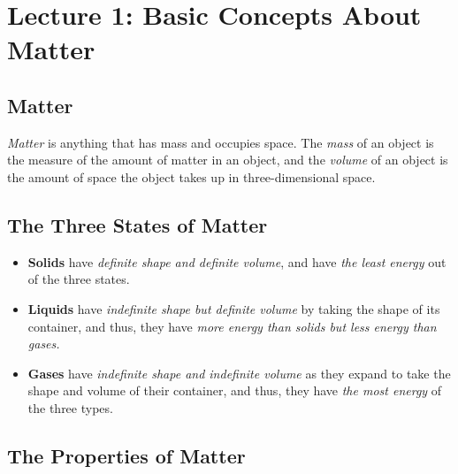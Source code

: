 \section{Lecture 1: Basic Concepts About Matter}

\subsection{Matter}

\begin{defn}
\textit{Matter} is anything that has mass and occupies space. The \textit{mass} of an object is the measure of the amount of matter in an object, and the \textit{volume} of an object is the amount of space the object takes up in three-dimensional space.
\end{defn}

\noindent
{}

\subsection{The Three States of Matter}

\begin{itemize}
\item \textbf{Solids} have \textit{definite shape and definite volume}, and have \textit{the least energy} out of the three states.
\item \textbf{Liquids} have \textit{indefinite shape but definite volume} by taking the shape of its container, and thus, they have \textit{more energy than solids but less energy than gases.}
\item \textbf{Gases} have \textit{indefinite shape and indefinite volume} as they expand to take the shape and volume of their container, and thus, they have \textit{the most energy} of the three types.
\end{itemize}

\noindent
{}

\subsection{The Properties of Matter}

